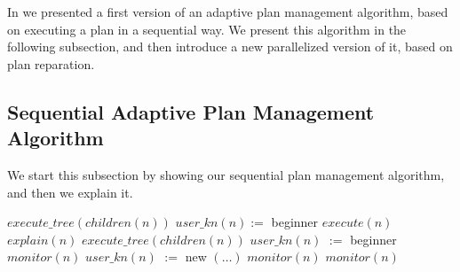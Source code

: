 In \cite{milliez2016using} we presented a first version of an adaptive plan management algorithm, based on executing a plan in a sequential way. We present this algorithm in the following subsection, and then introduce a new parallelized version of it, based on plan reparation.

\subsection{Sequential Adaptive Plan Management Algorithm}
\label{subsec:plan_management-sequential_plan_management}
We start this subsection by showing our sequential plan management algorithm, and then we explain it.

\begin{algorithmic}[1]
	\label{alg:onlyRobotStart}
        	\State $execute\_tree(children(n))$
            \State $user\_kn(n) :=$ beginner
        \Else
         	\State $execute(n)$
        \EndIf\label{alg:onlyRobotEnd}
    \label{alg:newStart}
     	\State $explain(n)$
          	\State $execute\_tree(children(n))$
            \State $user\_kn(n)$ $:=$ beginner
        \Else
         	\State $monitor(n)$
        \EndIf\label{alg:newEnd}
    \label{alg:beginnerStart}
          	\State $user\_kn(n)$ $:=$ new
            \State $(\dots)$ 
        \Else
          	\State $monitor(n)$
        \EndIf\label{alg:beginnerEnd}
    \label{alg:interStart}
      	\State $monitor(n)$
    \EndIf\label{alg:interEnd}
\EndFor
\end{algorithmic}


